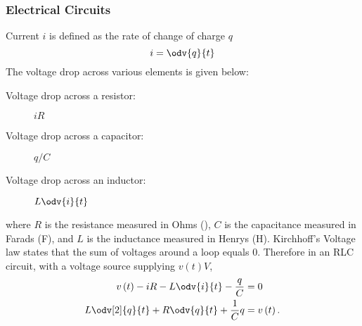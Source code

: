 \documentclass{article}
\begin{document}
\subsubsection{Electrical Circuits}
Current \(i\) is defined as the rate of change of charge \(q\)
\begin{equation*}
    i = \odv{q}{t}
\end{equation*}
The voltage drop across various elements is given below:
\begin{description}
    \item[Voltage drop across a resistor:] \(iR\)
    \item[Voltage drop across a capacitor:] \(q/C\)
    \item[Voltage drop across an inductor:] \(L \odv{i}{t}\)
\end{description}
where \(R\) is the resistance measured in Ohms (\unit{\Omega}),
\(C\) is the capacitance measured in Farads (\unit{F}),
and \(L\) is the inductance measured in Henrys (\unit{H}).
Kirchhoff's Voltage law states that the sum of voltages around a loop
equals 0. Therefore in an RLC circuit, with a voltage source supplying
\(v\left( t \right)\unit{V}\),
\begin{align*}
    v\left( t \right) - iR - L \odv{i}{t} - \frac{q}{C} & = 0                  \\
    L \odv[2]{q}{t} + R\odv{q}{t} + \frac{1}{C}q        & = v\left( t \right).
\end{align*}
\end{document}
